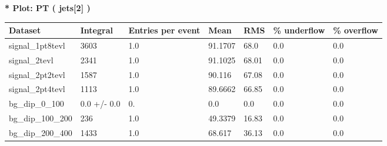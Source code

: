 \documentclass[a4paper, 10pt]{article}
\begin{document}
\textbf{* Plot: PT ( jets[2] ) }\\
   \begin{table}[H]
  \begin{center}
    \begin{tabular}{|m{23.0mm}|m{23.0mm}|m{18.0mm}|m{19.0mm}|m{19.0mm}|m{19.0mm}|m{19.0mm}|}
      \hline
      {\cellcolor{yellow}         Dataset}& {\cellcolor{yellow}         Integral}& {\cellcolor{yellow}         Entries per event}& {\cellcolor{yellow}         Mean}& {\cellcolor{yellow}         RMS}& {\cellcolor{yellow}         \% underflow}& {\cellcolor{yellow}         \% overflow}\\
      \hline
      {\cellcolor{white}         signal\_1pt8tevl}& {\cellcolor{white}         3603}& {\cellcolor{white}         1.0}& {\cellcolor{white}         91.1707}& {\cellcolor{white}         68.0}& {\cellcolor{green}         0.0}& {\cellcolor{green}         0.0}\\
      \hline
      {\cellcolor{white}         signal\_2tevl}& {\cellcolor{white}         2341}& {\cellcolor{white}         1.0}& {\cellcolor{white}         91.1025}& {\cellcolor{white}         68.01}& {\cellcolor{green}         0.0}& {\cellcolor{green}         0.0}\\
      \hline
      {\cellcolor{white}         signal\_2pt2tevl}& {\cellcolor{white}         1587}& {\cellcolor{white}         1.0}& {\cellcolor{white}         90.116}& {\cellcolor{white}         67.08}& {\cellcolor{green}         0.0}& {\cellcolor{green}         0.0}\\
      \hline
      {\cellcolor{white}         signal\_2pt4tevl}& {\cellcolor{white}         1113}& {\cellcolor{white}         1.0}& {\cellcolor{white}         89.6662}& {\cellcolor{white}         66.85}& {\cellcolor{green}         0.0}& {\cellcolor{green}         0.0}\\
      \hline
      {\cellcolor{white}         bg\_dip\_0\_100}& {\cellcolor{white}         0.0 +/\-- 0.0}& {\cellcolor{white}         0.}& {\cellcolor{white}         0.0}& {\cellcolor{white}         0.0}& {\cellcolor{green}         0.0}& {\cellcolor{green}         0.0}\\
      \hline
      {\cellcolor{white}         bg\_dip\_100\_200}& {\cellcolor{white}         236}& {\cellcolor{white}         1.0}& {\cellcolor{white}         49.3379}& {\cellcolor{white}         16.83}& {\cellcolor{green}         0.0}& {\cellcolor{green}         0.0}\\
      \hline
      {\cellcolor{white}         bg\_dip\_200\_400}& {\cellcolor{white}         1433}& {\cellcolor{white}         1.0}& {\cellcolor{white}         68.617}& {\cellcolor{white}         36.13}& {\cellcolor{green}         0.0}& {\cellcolor{green}         0.0}\\

\end{tabular}
\end{center}
\end{table}
\end{document}
